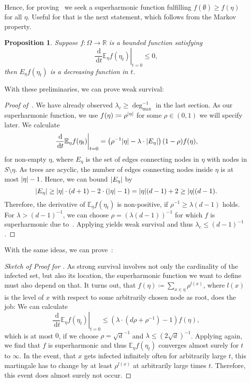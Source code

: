 \documentclass[a4paper,11pt]{amsart}
\theoremstyle{theorem}
\newtheorem{proposition}[theorem]{Proposition}
\theoremstyle{definition}
\newcommand{\diff}{\,\mathrm{d}}
\newcommand{\R}{\mathbb{R}}
\newcommand{\E}{\mathbb{E}}
\DeclarePairedDelimiter\abs{\lvert}{\rvert}%
\begin{document}
Hence, for proving~ we seek a superharmonic function fulfilling $f(\emptyset) \geq f(\eta)$ for all $\eta.$
Useful for that is the next statement, which follows from the Markov property.
\begin{proposition}\label{prop:superharmon}
	Suppose $f:\Omega \to \R$ is a bounded function satisfying $$\left. \frac{\diff}{\diff t} \E_\eta f(\eta_t) \right|_{t=0}\leq 0,$$
	then $E_\eta f(\eta_t)$ is a decreasing function in $t$.
\end{proposition}

With these preliminaries, we can prove weak survival:
\begin{proof}[Proof of~]
We have already observed $\lambda_c \geq \deg_{\max}^{-1}$ in the last section.
As our superharmonic function, we use $f(\eta)\coloneqq \rho^{\abs{\eta}}$ for some $\rho\in(0,1)$ we will specify later.
We calculate $$\left.\frac{\diff}{\diff t}\E_\eta f(\eta_t) \right|_{t=0}
= \left( \rho^{-1}\abs{\eta} - \lambda \cdot \abs{E_\eta} \right) (1-\rho) f(\eta),
$$
for non-empty $\eta$, where $E_\eta$ is the set of edges connecting nodes in $\eta$ with nodes in $S\setminus \eta$.
As trees are acyclic, the number of edges connecting nodes inside $\eta$ is at most $\abs{\eta}-1$.
Hence, we can bound $\abs{E_\eta}$ by
$$\abs{E_\eta} \geq \abs{\eta} \cdot (d+1) - 2\cdot(\abs{\eta} - 1) = \abs{\eta}(d - 1) + 2 \geq \abs{\eta} (d-1).$$
Therefore, the derivative of $\E_\eta f(\eta_t)$ is non-positive, if 
$\rho^{-1} \geq \lambda(d-1)$ holds.
For $\lambda > (d-1)^{-1}$, we can choose $\rho = (\lambda (d-1))^{-1}$ for which $f$ is superharmonic due to~.
Applying  yields weak survival and thus $\lambda_c \leq (d-1)^{-1}$.
\end{proof}

With the same ideas, we can prove~:
\begin{proof}[Sketch of Proof for ]
As strong survival involves not only the cardinality of the infected set, but also its location, the superharmonic function we want to define must also depend on that.
It turns out, that $f(\eta) \coloneqq \sum_{x\in\eta} \rho^{l(x)}$, where $l(x)$ is the level of $x$ with respect to some arbitrarily chosen node as root, does the job:
We can calculate $$\left. \frac{\diff}{\diff t} \E_\eta f(\eta_t) \right|_{t=0} \leq \left( \lambda \cdot (d\rho + \rho^{-1}) - 1 \right)f(\eta),$$
which is at most $0$, if we choose $\rho=\sqrt{d}^{-1}$ and $\lambda\leq(2\sqrt{d})^{-1}$.
Applying  again, we find that $f$ is superharmonic and thus $\E_\eta f(\eta_t)$ converges almost surely for $t$ to $\infty$.
In the event, that $x$ gets infected infinitely often for arbitrarily large $t$, this martingale has to change by at least $\rho^{l(x)}$ at arbitrarily large times $t$.
Therefore, this event does almost surely not occur.
\end{proof}
\end{document}
